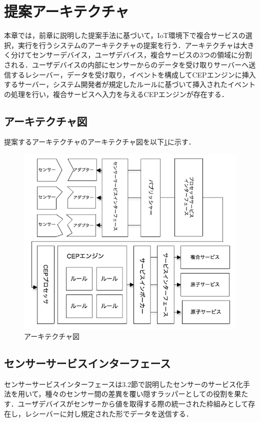 \documentclass{kuisthesis}			%
\begin{document}
\section{提案アーキテクチャ}
本章では，前章に説明した提案手法に基づいて，IoT環境下で複合サービスの選択，実行を行うシステムのアーキテクチャの提案を行う．アーキテクチャは大きく分けてセンサーデバイス，ユーザデバイス，複合サービスの3つの領域に分割される．ユーザデバイスの内部にセンサーからのデータを受け取りサーバーへ送信するレシーバー，データを受け取り，イベントを構成してCEPエンジンに挿入するサーバー，システム開発者が規定したルールに基づいて挿入されたイベントの処理を行い，複合サービスへ入力を与えるCEPエンジンが存在する．

\subsection{アーキテクチャ図}
提案するアーキテクチャのアーキテクチャ図を以下\ref{pic:archi}に示す．
\begin{figure}
 \begin{center}
  \includegraphics[width=\linewidth]{pic/Architectureimple.png}
  \caption{アーキテクチャ図}
  \label{pic:archi}
 \end{center}
\end{figure}

\subsection{センサーサービスインターフェース}
センサーサービスインターフェースは3.2節で説明したセンサーのサービス化手法を用いて，種々のセンサー間の差異を覆い隠すラッパーとしての役割を果たす．ユーザデバイスがセンサーから値を取得する際の統一された枠組みとして存在し，レシーバーに対し規定された形でデータを送信する．
\end{document}
